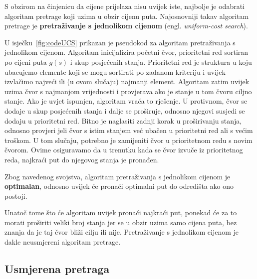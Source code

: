 \documentclass[times, utf8, zavrsni, numeric]{fer}
\begin{document}
\par S obzirom na činjenicu da cijene prijelaza nisu uvijek iste, najbolje je odabrati algoritam pretrage koji uzima u obzir cijenu puta.
Najosnovniji takav algoritam pretrage je \textbf{pretraživanje s jednolikom cijenom} (engl. \textit{uniform-cost search}).

\par U isječku~\ref{fig:codeUCS} prikazan je pseudokod za algoritam pretraživanja s jednolikom cijenom. 
Algoritam inicijalizira početni čvor, prioritetni red sortiran po cijeni puta \(g(s)\) i skup posjećenih stanja. 
Prioritetni red je struktura u koju ubacujemo elemente koji se mogu sortirati po zadanom kriteriju i uvijek izvlačimo najveći ili (u ovom slučaju) najmanji element.
Algoritam zatim uvijek uzima čvor s najmanjom vrijednosti i provjerava ako je stanje u tom čvoru ciljno stanje.
Ako je uvjet ispunjen, algoritam vraća to rješenje.
U protivnom, čvor se dodaje u skup posjećenih stanja i dalje se proširuje, odnosno njegovi susjedi se dodaju u prioritetni red.
Bitno je naglasiti zadnji korak u proširivanju stanja, odnosno provjeri jeli čvor s istim stanjem već ubačen u prioritetni red ali s većim troškom.
U tom slučaju, potrebno je zamijeniti čvor u prioritetnom redu s novim čvorom.
Ovime osiguravamo da u trenutku kada se čvor izvuče iz prioritetnog reda, najkraći put do njegovog stanja je pronađen.

\vspace{3mm}
\begin{minipage}{\textwidth}
	
\end{minipage}

\par Zbog navedenog svojstva, algoritam pretraživanja s jednolikom cijenom je \textbf{optimalan}, odnosno uvijek će pronaći optimalni put do odredišta ako ono postoji.

\par Unatoč tome što će algoritam uvijek pronaći najkraći put, ponekad će za to morati proširiti veliki broj stanja jer se u obzir uzima samo cijena puta, bez znanja da je taj čvor bliži cilju ili nije. 
Pretraživanje s jednolikom cijenom je dakle neusmjereni algoritam pretrage.

\subsection{Usmjerena pretraga}
\end{document}
